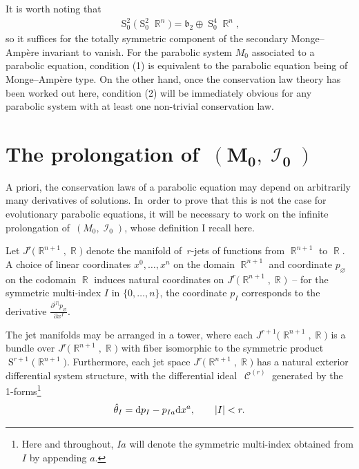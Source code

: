 \documentclass[10pt,a4paper]{amsart}
\DeclareMathOperator{\R}{\mathbb{R}}
\DeclareMathOperator{\Sym}{S}
\DeclareMathOperator{\I}{\mathcal{I}}
\DeclareMathOperator{\contact}{\mathcal{C}}
\renewcommand{\d}{{\rm d}}
\newcommand{\jet}[1]{J^{#1}\big(\R^{n+1},\R\big)}
\numberwithin{equation}{section}
\begin{document}
It is worth noting that
\begin{gather*}
\Sym^2_0 \big( \Sym^2_0 \R^n\big) = \mathfrak{b}_2 \oplus \Sym_0^4 \R^n ,
\end{gather*}
so it suffices for the totally symmetric component of the secondary Monge--Amp\`ere invariant to vanish.
For the parabolic system $M_0$ associated to a parabolic equation, condition (1) is equivalent to the parabolic equation being of Monge--Amp\`ere type. On the other hand, once the conservation law theory has been worked out here, condition (2) will be immediately obvious for any parabolic system with at least one non-trivial conservation law.

\section[The prolongation of (M0, I0)]{The prolongation of~$\boldsymbol{(M_0,\I_0)}$}\label{sec:prolongation of M_0}

A priori, the conservation laws of a parabolic equation may depend on arbitrarily many derivatives of solutions. In~order to prove that this is not the case for evolutionary parabolic equations, it will be necessary to work on the infinite prolongation of~$(M_0, \I_0)$, whose definition I recall here.

Let $\jet{r}$ denote the manifold of~$r$-jets of functions from $\R^{n+1}$ to $\R$. A choice of linear coordinates $x^0,\dots, x^n$ on the domain $\R^{n+1}$ and coordinate $p_\varnothing$ on the codomain $\R$ induces natural coordinates on $\jet{r}$~-- for the symmetric multi-index $I$ in $\{0 , \dots , n\}$, the coordinate $p_I$ corresponds to the derivative $\frac{\partial^{|I|}p_\varnothing}{\partial x^I}$.

The jet manifolds may be arranged in a tower, where each $\jet{r+1}$ is a bundle over $\jet{r}$ with fiber isomorphic to the symmetric product $\Sym^{r+1}\big(\R^{n+1}\big)$. Furthermore, each jet space $\jet{r}$ has a natural exterior differential system structure, with the differential ideal~$\contact^{(r)}$ generated by the 1-forms\footnote{Here and throughout, $Ia$ will denote the symmetric multi-index obtained from $I$ by appending $a$.}
\begin{gather*}
\hat\theta_I = \d p_I - p_{Ia}\d x^a, \qquad |I| < r .
\end{gather*}
\end{document}
